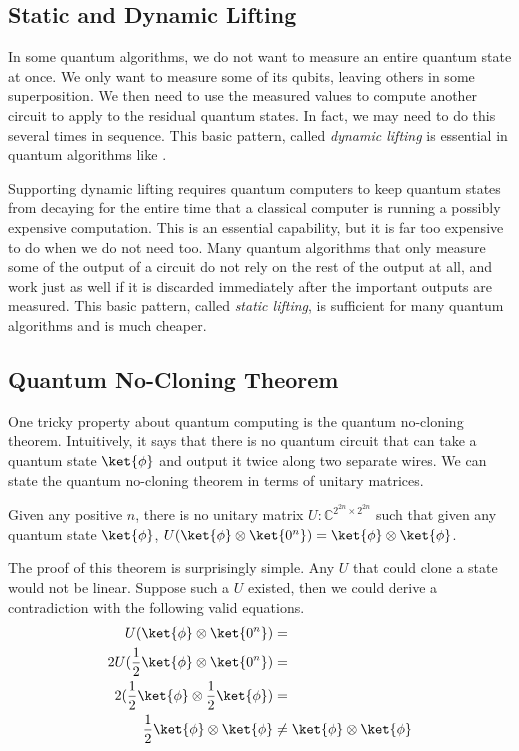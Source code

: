 \subsection{Static and Dynamic Lifting}
\label{sec:lifting}
In some quantum algorithms, we do not want to measure an entire quantum state at once.
We only want to measure some of its qubits, leaving others in some superposition.
We then need to use the measured values to compute another circuit to apply to the residual quantum states.
In fact, we may need to do this several times in sequence.
This basic pattern, called \emph{dynamic lifting} is essential in quantum algorithms like .

Supporting dynamic lifting requires quantum computers to keep quantum states from decaying for the entire time that a classical computer is running a possibly expensive computation. 
This is an essential capability, but it is far too expensive to do when we do not need too.
Many quantum algorithms that only measure some of the output of a circuit do not rely on the rest of the output at all, and work just as well if it is discarded immediately after the important outputs are measured.
This basic pattern, called \emph{static lifting}, is sufficient for many quantum algorithms and is much cheaper.

\subsection{Quantum No-Cloning Theorem}
One tricky property about quantum computing is the quantum no-cloning theorem.
Intuitively, it says that there is no quantum circuit that can take a quantum state $\ket{\phi}$ and output it twice along two separate wires.
We can state the quantum no-cloning theorem in terms of unitary matrices.
\begin{theorem}
Given any positive $n$, there is no unitary matrix $U:\mathbb{C}^{2^{2n}\times 2^{2n}}$ such that given any quantum state $\ket{\phi}$,
$U(\ket{\phi}\otimes\ket{0^n}) = \ket{\phi} \otimes \ket{\phi}$.
\end{theorem}
The proof of this theorem is surprisingly simple.
Any $U$ that could clone a state would not be linear.
Suppose such a $U$ existed, then we could derive a contradiction with the following valid equations.
\begin{align*}
U(\ket{\phi}\otimes\ket{0^n}) &=\\
2U(\frac{1}{2}\ket{\phi} \otimes \ket{0^n}) &=\\
2(\frac{1}{2}\ket{\phi} \otimes \frac{1}{2}\ket{\phi}) &=\\
\frac{1}{2} \ket{\phi} \otimes \ket{\phi} &\neq \ket{\phi} \otimes \ket{\phi}
\end{align*}

